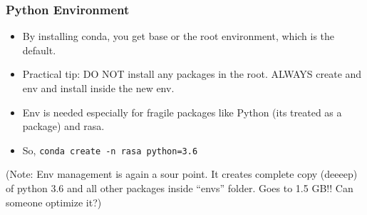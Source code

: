 


 \begin{frame}[fragile]\frametitle{Python Environment}
\begin{itemize}
\item By installing conda, you get base or the root environment, which is the default.
\item Practical tip: DO NOT install any packages in the root. ALWAYS create and env and install inside the new env.
\item Env is needed especially for fragile packages like Python (its treated as a package) and rasa.
\item So, \lstinline|conda create -n rasa python=3.6| 
\end{itemize}

(Note: Env management is again a sour point. It creates complete copy (deeeep) of python 3.6 and all other packages inside ``envs'' folder. Goes to 1.5 GB!! Can someone optimize it?)
\end{frame}

